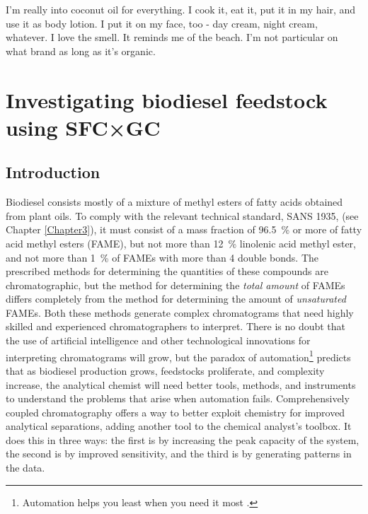 
\begin{savequote}[\quotewidth] I'm really into coconut oil for everything. I cook it,
eat it, put it in my hair, and use it as body lotion. I put it on my face, too -
day cream, night cream, whatever. I love the smell. It reminds me of the beach.
I'm not particular on what brand as long as it's organic.

\end{savequote}

\chapter{Investigating biodiesel feedstock using SFC×GC} %

\label{Chapter6} %

\section{Introduction}


Biodiesel consists mostly of a mixture of methyl esters of fatty acids obtained
from plant oils. To comply with the relevant technical standard, SANS 1935,
\autocite{SANS1935} (see Chapter \ref{Chapter3}), it must consist of a mass
fraction of \SI{96.5}{\percent} or more of fatty acid methyl esters (FAME), but
not more than \SI{12}{\percent} linolenic acid methyl ester, and not more than
\SI{1}{\percent} of FAMEs with more than \num{4} double bonds. The prescribed
methods for determining the quantities of these compounds are chromatographic,
but the method for  determining the \emph{total amount} of FAMEs differs
completely from the method for determining the amount of \emph{unsaturated}
FAMEs. Both these methods generate complex chromatograms that need highly
skilled and experienced chromatographers to interpret. There is no doubt that
the use of artificial intelligence and other technological innovations for
interpreting chromatograms will grow, but the paradox of
automation\footnote{Automation helps you least when you need it most
\autocite{Strauch2018, Bainbridge1983}.} predicts that as biodiesel production
grows, feedstocks proliferate, and complexity increase, the analytical chemist
will need better tools, methods, and instruments to understand the problems that
arise when automation fails. Comprehensively coupled chromatography offers a way
to better exploit chemistry for improved analytical separations, adding another
tool to the chemical analyst's toolbox. It does this in three ways: the first is
by increasing the peak capacity of the system, the second is by improved
sensitivity, and the third is by generating patterns in the data.

